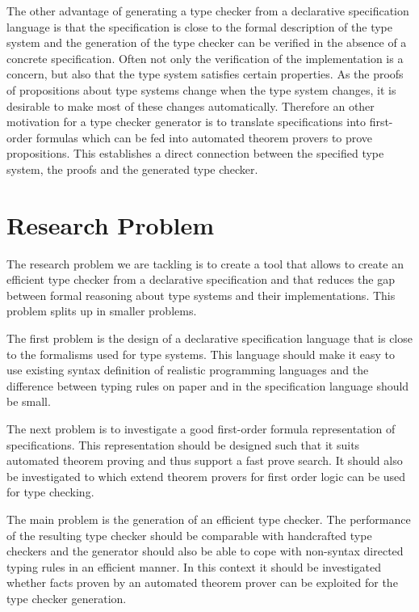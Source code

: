 \documentclass[preprint]{sigplanconf}
\begin{document}
The other advantage of generating a type checker from a declarative
specification language is that the specification is close to the
formal description of the type system and the generation of the type
checker can be verified in the absence of a concrete
specification. Often not only the verification of the implementation
is a concern, but also that the type system satisfies certain
properties. As the proofs of propositions about type systems change
when the type system changes, it is desirable to make most of these
changes automatically. Therefore an other motivation for a type
checker generator is to translate specifications into first-order
formulas which can be fed into automated theorem provers to prove
propositions. This establishes a direct connection between the
specified type system, the proofs  and the generated type checker.

\section{Research Problem}
The research problem we are tackling is to create a tool that allows
to create an efficient type checker from a declarative specification
and that reduces the gap between formal reasoning about type systems
and their implementations. This problem splits up in smaller problems.

The first problem is the design of a declarative specification
language that is close to the formalisms used for type systems. This
language should make it easy to use existing syntax definition of
realistic programming languages and the difference between typing
rules on paper and in the specification language should be small.

The next problem is to investigate a good first-order formula
representation of specifications. This representation should be
designed such that it suits automated theorem proving and thus support
a fast prove search. It should also be investigated to which extend
theorem provers for first order logic can be used for type checking.

The main problem is the generation of an efficient type checker. The
performance of the resulting type checker should be comparable with
handcrafted type checkers and the generator should also be able to
cope with non-syntax directed typing rules in an efficient manner. In
this context it should be investigated whether facts proven by an
automated theorem prover can be exploited for the type checker
generation.
\end{document}
